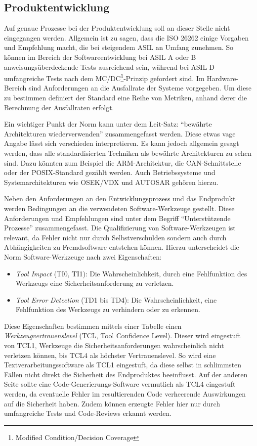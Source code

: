 \documentclass[
  a4paper,					    %
  twoside,
  DIV=calc,     				%
  bibliography=totoc,
  cleardoublepage=empty,
  ngerman,     					%
  final       					%
]{scrbook}
\begin{document}
\subsection{Produktentwicklung}
\label{sec:ISO26262_produkt_entwicklung}
Auf genaue Prozesse bei der Produktentwicklung soll an dieser Stelle nicht eingegangen werden. Allgemein ist zu sagen, dass die ISO 26262 einige Vorgaben und Empfehlung macht, die bei steigendem ASIL an Umfang zunehmen. So können im Bereich der Softwareentwicklung bei ASIL A oder B anweisungsüberdeckende Tests ausreichend sein, während bei ASIL D umfangreiche Tests nach dem MC/DC\footnote{Modified Condition/Decision Coverage}-Prinzip gefordert sind. Im Hardware-Bereich sind Anforderungen an die Ausfallrate der Systeme vorgegeben. Um diese zu bestimmen definiert der Standard eine Reihe von Metriken, anhand derer die Berechnung der Ausfallraten erfolgt.

Ein wichtiger Punkt der Norm kann unter dem Leit-Satz: "`bewährte Architekturen wiederverwenden"' zusammengefasst werden. Diese etwas vage Angabe lässt sich verschieden interpretieren. Es kann jedoch allgemein gesagt werden, dass alle standardisierten Techniken als bewährte Architekturen zu sehen sind. Dazu könnten zum Beispiel die ARM-Architektur, die CAN-Schnittstelle oder der POSIX-Standard gezählt werden. Auch Betriebssysteme und Systemarchitekturen wie OSEK/VDX und AUTOSAR gehören hierzu.

Neben den Anforderungen an den Entwicklungsprozess und das Endprodukt werden Bedingungen an die verwendeten Software-Werkzeuge gestellt. Diese Anforderungen und Empfehlungen sind unter dem Begriff "`Unterstützende Prozesse"' zusammengefasst. Die Qualifizierung von Software-Werkzeugen ist relevant, da Fehler nicht nur durch Selbstverschulden sondern auch durch Abhängigkeiten zu Fremdsoftware entstehen können. Hierzu unterscheidet die Norm Software-Werkzeuge nach zwei Eigenschaften:

\begin{itemize}
    \item \emph{Tool Impact} (TI0, TI1): Die Wahrscheinlichkeit, durch eine Fehlfunktion des Werkzeugs eine Sicherheitsanforderung zu verletzen.
    \item \emph{Tool Error Detection} (TD1 bis TD4): Die Wahrscheinlichkeit, eine Fehlfunktion des Werkzeugs zu verhindern oder zu erkennen.
\end{itemize}

Diese Eigenschaften bestimmen mittels einer Tabelle einen \emph{Werkzeugvertrauenslevel} (TCL, Tool Confidence Level). Dieser wird eingestuft von TCL1, Werkzeuge die Sicherheitsanforderungen wahrscheinlich nicht verletzen können, bis TCL4 als höchster Vertrauenslevel. So wird eine Textverarbeitungssoftware als TCL1 eingestuft, da diese selbst in schlimmsten Fällen nicht direkt die Sicherheit des Endproduktes beeinflusst. Auf der anderen Seite sollte eine Code-Generierungs-Software vermutlich als TCL4 eingestuft werden, da eventuelle Fehler im resultierenden Code verheerende Auswirkungen auf die Sicherheit haben. Zudem können erzeugte Fehler hier nur durch umfangreiche Tests und Code-Reviews erkannt werden.
\end{document}
